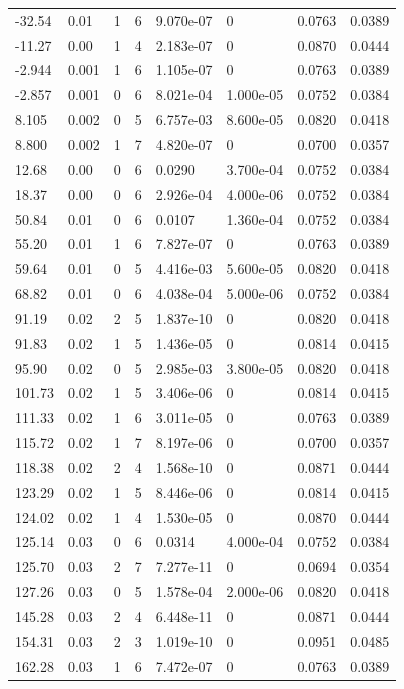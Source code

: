 \documentclass[preview]{standalone}
\begin{document}
{{\begin{tabular}{L{1.2cm}C{1.2cm} C{0.3cm}C{0.5cm} C{1.4cm}C{1.4cm} C{1.4cm}C{1.4cm}}
  -32.54  &  0.01  & 1     &  6 &  9.070e-07  & 0  & 0.0763 &  0.0389   \\ 
  -11.27  &  0.00  & 1     &  4 &  2.183e-07  & 0  & 0.0870 &  0.0444   \\ 
  -2.944  &  0.001  & 1     &  6 &  1.105e-07  & 0  & 0.0763 &  0.0389   \\ 
  -2.857  &  0.001  & 0     &  6 &  8.021e-04  & 1.000e-05  & 0.0752 &  0.0384   \\ 
  8.105  &  0.002  & 0     &  5 &  6.757e-03  & 8.600e-05  & 0.0820 &  0.0418   \\ 
  8.800  &  0.002  & 1     &  7 &  4.820e-07  & 0  & 0.0700 &  0.0357   \\ 
  12.68  &  0.00  & 0     &  6 &  0.0290  & 3.700e-04  & 0.0752 &  0.0384   \\ 
  18.37  &  0.00  & 0     &  6 &  2.926e-04  & 4.000e-06  & 0.0752 &  0.0384   \\ 
  50.84  &  0.01  & 0     &  6 &  0.0107  & 1.360e-04  & 0.0752 &  0.0384   \\ 
  55.20  &  0.01  & 1     &  6 &  7.827e-07  & 0  & 0.0763 &  0.0389   \\ 
  59.64  &  0.01  & 0     &  5 &  4.416e-03  & 5.600e-05  & 0.0820 &  0.0418   \\ 
  68.82  &  0.01  & 0     &  6 &  4.038e-04  & 5.000e-06  & 0.0752 &  0.0384   \\ 
  91.19  &  0.02  & 2     &  5 &  1.837e-10  & 0  & 0.0820 &  0.0418   \\ 
  91.83  &  0.02  & 1     &  5 &  1.436e-05  & 0  & 0.0814 &  0.0415   \\ 
  95.90  &  0.02  & 0     &  5 &  2.985e-03  & 3.800e-05  & 0.0820 &  0.0418   \\ 
  101.73  &  0.02  & 1     &  5 &  3.406e-06  & 0  & 0.0814 &  0.0415   \\ 
  111.33  &  0.02  & 1     &  6 &  3.011e-05  & 0  & 0.0763 &  0.0389   \\ 
  115.72  &  0.02  & 1     &  7 &  8.197e-06  & 0  & 0.0700 &  0.0357   \\ 
  118.38  &  0.02  & 2     &  4 &  1.568e-10  & 0  & 0.0871 &  0.0444   \\ 
  123.29  &  0.02  & 1     &  5 &  8.446e-06  & 0  & 0.0814 &  0.0415   \\ 
  124.02  &  0.02  & 1     &  4 &  1.530e-05  & 0  & 0.0870 &  0.0444   \\ 
  125.14  &  0.03  & 0     &  6 &  0.0314  & 4.000e-04  & 0.0752 &  0.0384   \\ 
  125.70  &  0.03  & 2     &  7 &  7.277e-11  & 0  & 0.0694 &  0.0354   \\ 
  127.26  &  0.03  & 0     &  5 &  1.578e-04  & 2.000e-06  & 0.0820 &  0.0418   \\ 
  145.28  &  0.03  & 2     &  4 &  6.448e-11  & 0  & 0.0871 &  0.0444   \\ 
  154.31  &  0.03  & 2     &  3 &  1.019e-10  & 0  & 0.0951 &  0.0485   \\ 
  162.28  &  0.03  & 1     &  6 &  7.472e-07  & 0  & 0.0763 &  0.0389   \\ 
\hline 
\end{tabular} 

}}
\end{document}
